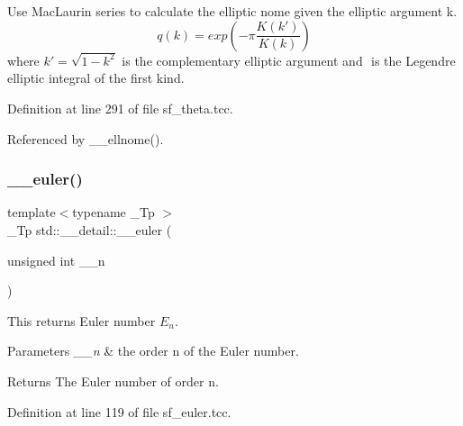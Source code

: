 Use Mac\+Laurin series to calculate the elliptic nome given the elliptic argument k. \[ q(k) = exp\left(-\pi\frac{K(k')}{K(k)}\right) \] where $ k' = \sqrt{1 - k^2} $ is the complementary elliptic argument and $ $ is the Legendre elliptic integral of the first kind. 

Definition at line 291 of file sf\+\_\+theta.\+tcc.



Referenced by \+\_\+\+\_\+ellnome().

\mbox{\label{namespacestd_1_1____detail_a38f2ed4541c9876b8549c3917aad3b08}} 
\subsubsection{\texorpdfstring{\+\_\+\+\_\+euler()}{\_\_euler()}\hspace{0.1cm}{\footnotesize\ttfamily [1/2]}}
{\footnotesize\ttfamily template$<$typename \+\_\+\+Tp $>$ \\
\+\_\+\+Tp std\+::\+\_\+\+\_\+detail\+::\+\_\+\+\_\+euler (\begin{DoxyParamCaption}\item[{unsigned int}]{\+\_\+\+\_\+n }\end{DoxyParamCaption})\hspace{0.3cm}{\ttfamily [inline]}}



This returns Euler number $ E_n $. 


\begin{DoxyParams}{Parameters}
{\em \+\_\+\+\_\+n} & the order n of the Euler number. \\
\hline
\end{DoxyParams}
\begin{DoxyReturn}{Returns}
The Euler number of order n. 
\end{DoxyReturn}


Definition at line 119 of file sf\+\_\+euler.\+tcc.

\mbox{\label{namespacestd_1_1____detail_aa44d18f565c3c36ba0351374dc4af09d}} 

